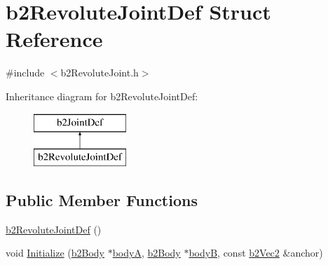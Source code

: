 \hypertarget{structb2_revolute_joint_def}{}\section{b2\+Revolute\+Joint\+Def Struct Reference}
\label{structb2_revolute_joint_def}


{\ttfamily \#include $<$b2\+Revolute\+Joint.\+h$>$}

Inheritance diagram for b2\+Revolute\+Joint\+Def\+:\begin{figure}[H]
\begin{center}
\leavevmode
\includegraphics[height=2.000000cm]{structb2_revolute_joint_def}
\end{center}
\end{figure}
\subsection*{Public Member Functions}
\begin{DoxyCompactItemize}
\item 
\mbox{\hyperlink{structb2_revolute_joint_def_a20296c13c3102d03eb8787e463ff63d1}{b2\+Revolute\+Joint\+Def}} ()
\item 
void \mbox{\hyperlink{structb2_revolute_joint_def_a6401b2a663533415d032a525e4fa2806}{Initialize}} (\mbox{\hyperlink{classb2_body}{b2\+Body}} $\ast$\mbox{\hyperlink{structb2_joint_def_a8cd54c93da396be75a9788f2c6897f05}{bodyA}}, \mbox{\hyperlink{classb2_body}{b2\+Body}} $\ast$\mbox{\hyperlink{structb2_joint_def_aa4f4dee2fbcd12187b19506b60e68e3d}{bodyB}}, const \mbox{\hyperlink{structb2_vec2}{b2\+Vec2}} \&anchor)
\end{DoxyCompactItemize}
